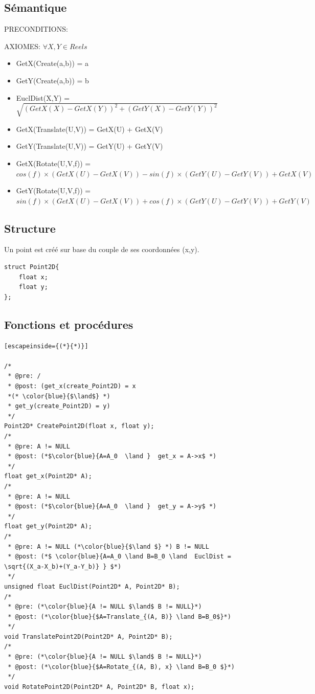 \documentclass[a4paper, 11pt, oneside]{article}
\begin{document}
\subsection{Sémantique}
\noindent PRECONDITIONS:

\noindent AXIOMES: 
$\forall X,Y \in Reels$
\begin{itemize}
    \item GetX(Create(a,b)) = a
    \item GetY(Create(a,b)) = b
    \item EuclDist(X,Y) = $\sqrt{{(GetX(X)-GetX(Y))}^{2}+{(GetY(X)-GetY(Y))}^{2}}$
    \item GetX(Translate(U,V)) = GetX(U) + GetX(V)
    \item GetY(Translate(U,V)) = GetY(U) + GetY(V)
    \item GetX(Rotate(U,V,f)) = $cos(f) \times (GetX(U)-GetX(V)) - sin(f) \times (GetY(U)-GetY(V)) + GetX(V) $ 
    \item GetY(Rotate(U,V,f)) = $sin(f) \times (GetX(U)-GetX(V)) + cos(f) \times (GetY(U)-GetY(V)) + GetY(V) $ 
    
    
    
\end{itemize}

\subsection{Structure}
Un point est créé sur base du couple de ses coordonnées (x,y). 

\begin{lstlisting}
struct Point2D{
	float x;
	float y;
};
\end{lstlisting}

\subsection{Fonctions et procédures}

\begin{lstlisting}[escapeinside={(*}{*)}]

/* 
 * @pre: /
 * @post: (get_x(create_Point2D) = x 
 *(* \color{blue}{$\land$} *)
 * get_y(create_Point2D) = y) 
 */
Point2D* CreatePoint2D(float x, float y);
/* 
 * @pre: A != NULL
 * @post: (*$\color{blue}{A=A_0  \land }  get_x = A->x$ *)
 */
float get_x(Point2D* A);
/* 
 * @pre: A != NULL
 * @post: (*$\color{blue}{A=A_0  \land }  get_y = A->y$ *)
 */
float get_y(Point2D* A);
/* 
 * @pre: A != NULL (*\color{blue}{$\land $} *) B != NULL
 * @post: (*$ \color{blue}{A=A_0 \land B=B_0 \land  EuclDist = \sqrt{(X_a-X_b)+(Y_a-Y_b)} } $*)
 */
unsigned float EuclDist(Point2D* A, Point2D* B);
/* 
 * @pre: (*\color{blue}{A != NULL $\land$ B != NULL}*)
 * @post: (*\color{blue}{$A=Translate_{(A, B)} \land B=B_0$}*)
 */
void TranslatePoint2D(Point2D* A, Point2D* B);
/* 
 * @pre: (*\color{blue}{A != NULL $\land$ B != NULL}*)
 * @post: (*\color{blue}{$A=Rotate_{(A, B), x} \land B=B_0 $}*)
 */
void RotatePoint2D(Point2D* A, Point2D* B, float x);
\end{lstlisting}
\end{document}
